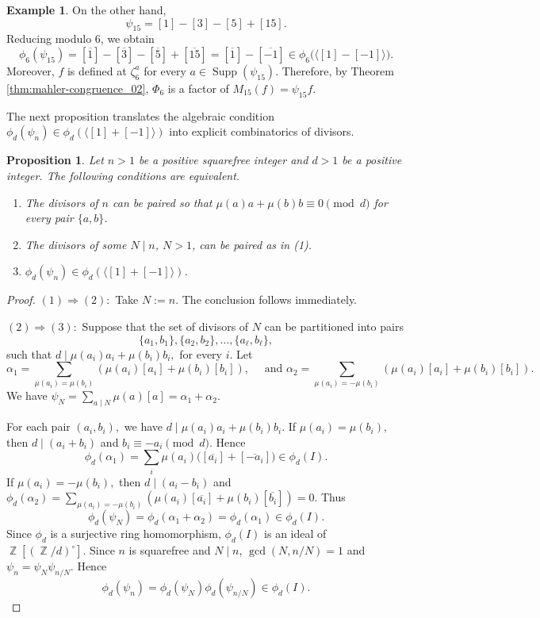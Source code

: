 \documentclass[12t,a4paper]{amsart}
\newtheorem{prop}[thm]{Proposition}
\theoremstyle{definition}
\newtheorem{expl}[thm]{Example}
\DeclareMathOperator{\Z}{\mathbb{Z}}
\numberwithin{equation}{section}
\begin{document}
{\begin{expl}
    On the other hand, \[ \psi_{15}=[1]-[3]-[5]+[15]. \] Reducing modulo $6$, we obtain \[ \phi_6(\psi_{15}) = [\overline{1}]-[\overline{3}]-[\overline{5}]+[\overline{15}] =   [\overline{1}]-[\overline{-1}]  \in \phi_6\bigl(\langle [1]-[-1]\rangle\bigr). \] 
    Moreover,  $f$ is defined at $\zeta_6^a$ for every $a\in \operatorname{Supp}(\psi_{15})$. Therefore, by Theorem \ref{thm:mahler-congruence_02}, $\Phi_6$ is a factor of \(  M_{15}(f)=\psi_{15}f. \)
\end{expl}
The next proposition translates the algebraic condition  $\phi_d(\psi_n)\in \phi_d(\langle [1] + [-1] \rangle)$ into explicit combinatorics of divisors.
\begin{prop} \label{pro:equivalence}
   Let $n>1$ be a positive squarefree integer and  $d>1$ be a positive integer. %
   The following conditions are equivalent.
   \begin{enumerate}
       \item The divisors of \(n\) can be paired so that
      \(\mu(a)a+\mu(b)b\equiv 0 \pmod d\)
      for every pair \(\{a,b\}\).
          \item The divisors of some $N\mid n$, $N>1$, can be paired as in (1).
            \item $\phi_d(\psi_n)\in \phi_d(\langle [1] + [-1] \rangle)$.%
   \end{enumerate}
   \end{prop}
\begin{proof}
    $(1)\Rightarrow (2):$ Take $N := n.$ The conclusion follows immediately.
    
    $(2)\Rightarrow (3):$ Suppose that the set of divisors of $N$ can be partitioned  into pairs 
        \[
\{a_1,b_1\},\{a_2,b_2\},\ldots,\{a_\ell,b_\ell\}, \] 
such that $d\mid \mu(a_i)a_i+\mu(b_i)b_i,$ for every $i$. 
    Let
\[
\alpha_1=\sum_{\mu(a_i)=\mu(b_i)}(\mu(a_i)[a_i]+\mu(b_i)[b_i]),\quad\text{ and } \alpha_2=\sum\limits_{\mu(a_i)=-\mu(b_i)}(\mu(a_i)[a_i]+\mu(b_i)[b_i]).
\]
    We have $\psi_N=\sum_{a\mid N}\mu(a)[a]=\alpha_1+\alpha_2$.  
    
For each pair $(a_i,b_i),$ we have \(d\mid \mu(a_i)a_i+\mu(b_i)b_i.\) 
If $\mu(a_i)=\mu(b_i),$
then $d\mid(a_i+b_i)$ and $b_i\equiv -a_i\pmod d$. Hence 
\[
\phi_d(\alpha_1)
 =\sum_i\mu(a_i)\bigl([\overline{a_i}]+[\overline{-a_i}]\bigr)
 \in\phi_d(I).
\]
If $\mu(a_i)=-\mu(b_i),$
then $d\mid(a_i-b_i)$ and
$
\phi_d(\alpha_2)=\sum\limits_{\mu(a_i)=-\mu(b_i)}(\mu(a_i)[\overline{a_i}]+\mu(b_i)[\overline{b_i}]) =0.
$
Thus
\[
\phi_d(\psi_N)=\phi_d(\alpha_1+\alpha_2)=\phi_d(\alpha_1)\in\phi_d(I).
\]
Since $\phi_d$ is a surjective ring homomorphism, $\phi_d(I)$ is an ideal of $\Z[(\Z/d)^\circ]$. 
Since $n$ is squarefree  and $N\mid n$, $\gcd(N,n/N)=1$ and  $\psi_n = \psi_N \psi_{n/N}.$ Hence
\[
\phi_d(\psi_n)=\phi_d(\psi_N)\phi_d(\psi_{n/N})\in \phi_d(I).
\]


\end{proof}}
\end{document}
